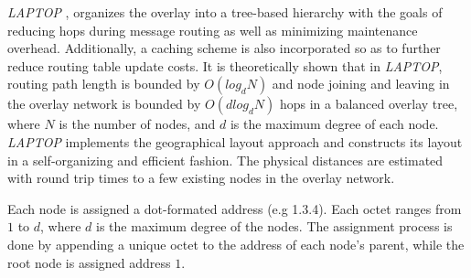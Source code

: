 \emph{LAPTOP} \cite{WLH2007}, organizes the overlay into a tree-based hierarchy
with the goals of reducing hops during message routing as well as minimizing
maintenance overhead. Additionally, a caching scheme is also incorporated so as
to further reduce routing table update costs. It is theoretically shown
that in \emph{LAPTOP}, routing path length is bounded by $O(log_d N)$ and node
joining and leaving in the overlay network is bounded by
$O\left( d log_d N \right)$ hops in a balanced overlay tree, where $N$ is the
number of nodes, and $d$ is the maximum degree of each node. \emph{LAPTOP}
implements the geographical layout approach  and constructs its layout in a
self-organizing and efficient fashion. The physical distances are estimated
with round trip times to a few existing nodes in the overlay network.

Each node is assigned a dot-formated address (e.g 1.3.4). Each octet ranges from
$1$ to $d$, where $d$ is the maximum degree of the nodes. The assignment process
is done by appending a unique octet to the address of each node's parent, while
the root node is assigned address $1$.

%


